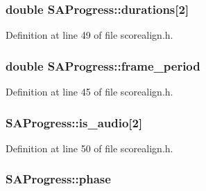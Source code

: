 \subsubsection[{\texorpdfstring{durations}{durations}}]{\setlength{\rightskip}{0pt plus 5cm}double S\+A\+Progress\+::durations\mbox{[}2\mbox{]}\hspace{0.3cm}{\ttfamily [protected]}}\hypertarget{class_s_a_progress_a99f86b80ab45db194387b1e36efdf3ab}{}\label{class_s_a_progress_a99f86b80ab45db194387b1e36efdf3ab}


Definition at line 49 of file scorealign.\+h.

\subsubsection[{\texorpdfstring{frame\+\_\+period}{frame_period}}]{\setlength{\rightskip}{0pt plus 5cm}double S\+A\+Progress\+::frame\+\_\+period\hspace{0.3cm}{\ttfamily [protected]}}\hypertarget{class_s_a_progress_a43550c28b2da94d6d5358d337058468f}{}\label{class_s_a_progress_a43550c28b2da94d6d5358d337058468f}


Definition at line 45 of file scorealign.\+h.

\subsubsection[{\texorpdfstring{is\+\_\+audio}{is_audio}}]{ S\+A\+Progress\+::is\+\_\+audio\mbox{[}2\mbox{]}\hspace{0.3cm}{\ttfamily [protected]}}\hypertarget{class_s_a_progress_aa727027702198f09d68bd1fa4c759ff3}{}\label{class_s_a_progress_aa727027702198f09d68bd1fa4c759ff3}


Definition at line 50 of file scorealign.\+h.

\subsubsection[{\texorpdfstring{phase}{phase}}]{ S\+A\+Progress\+::phase\hspace{0.3cm}{\ttfamily [protected]}}\hypertarget{class_s_a_progress_a838bea68f6f1db3a3c03bad50e3bd395}{}\label{class_s_a_progress_a838bea68f6f1db3a3c03bad50e3bd395}


